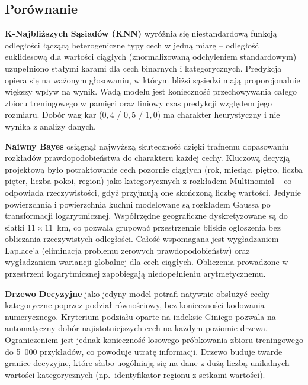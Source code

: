 \documentclass[12pt,a4paper]{article}
\begin{document}
	
	\newpage
	\subsection*{Porównanie}
    

    \textbf{K-Najbliższych Sąsiadów (KNN)} wyróżnia się niestandardową funkcją odległości łączącą heterogeniczne typy cech w jedną miarę -- odległość euklidesową dla wartości ciągłych (znormalizowaną odchyleniem standardowym) uzupełniono stałymi karami dla cech binarnych i kategorycznych. Predykcja opiera się na ważonym głosowaniu, w którym bliżsi sąsiedzi mają proporcjonalnie większy wpływ na wynik. Wadą modelu jest konieczność przechowywania całego zbioru treningowego w pamięci oraz liniowy czas predykcji względem jego rozmiaru. Dobór wag kar ($0{,}4$ / $0{,}5$ / $1{,}0$) ma charakter heurystyczny i nie wynika z analizy danych.
    
    \bigskip
    
    \textbf{Naiwny Bayes} osiągnął najwyższą skuteczność dzięki trafnemu dopasowaniu rozkładów prawdopodobieństwa do charakteru każdej cechy. Kluczową decyzją projektową było potraktowanie cech pozornie ciągłych (rok, miesiąc, piętro, liczba pięter, liczba pokoi, region) jako kategorycznych z rozkładem Multinomial -- co odpowiada rzeczywistości, gdyż przyjmują one skończoną liczbę wartości. Jedynie powierzchnia i powierzchnia kuchni modelowane są rozkładem Gaussa po transformacji logarytmicznej. Współrzędne geograficzne dyskretyzowane są do siatki $11 \times 11$~km, co pozwala grupować przestrzennie bliskie ogłoszenia bez obliczania rzeczywistych odległości. Całość wspomagana jest wygładzaniem Laplace'a (eliminacja problemu zerowych prawdopodobieństw) oraz wygładzaniem wariancji globalnej dla cech ciągłych. Obliczenia prowadzone w przestrzeni logarytmicznej zapobiegają niedopełnieniu arytmetycznemu.
    
    \bigskip
    
    \textbf{Drzewo Decyzyjne} jako jedyny model potrafi natywnie obsłużyć cechy kategoryczne poprzez podział równościowy, bez konieczności kodowania numerycznego. Kryterium podziału oparte na indeksie Giniego pozwala na automatyczny dobór najistotniejszych cech na każdym poziomie drzewa. Ograniczeniem jest jednak konieczność losowego próbkowania zbioru treningowego do 5~000 przykładów, co powoduje utratę informacji. Drzewo buduje twarde granice decyzyjne, które słabo uogólniają się na dane z dużą liczbą unikalnych wartości kategorycznych (np.\ identyfikator regionu z setkami wartości).
    
\end{document}
